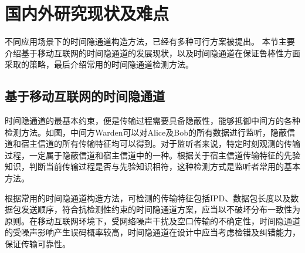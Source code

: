 \section{国内外研究现状及难点}
\label{sec:intro:background}

不同应用场景下的时间隐通道构造方法，已经有多种可行方案被提出。
本节主要介绍基于移动互联网的时间隐通道的发展现状，以及时间隐通道在保证鲁棒性方面采取的策略，最后介绍常用的时间隐通道检测方法。

\subsection{基于移动互联网的时间隐通道}
\label{sec:intro:background:ctc}

时间隐通道的最基本约束，便是传输过程需要具备隐蔽性，能够抵御中间方的各种检测方法。如图，中间方Warden可以对Alice及Bob的所有数据进行监听，隐蔽信道和宿主信道的所有传输特征均可以得到。对于监听者来说，特定时刻观测的传输过程，一定属于隐蔽信道和宿主信道中的一种。根据关于宿主信道传输特征的先验知识，判断当前传输过程是否与先验知识相符，这种检测方式是监听者常用的基本方法。

根据常用的时间隐通道构造方法，可检测的传输特征包括IPD、数据包长度以及数据包发送顺序，符合抗检测性约束的时间隐通道方案，应当以不破坏分布一致性为原则。在移动互联网环境下，受网络噪声干扰及空口传输的不确定性，时间隐通道的受噪声影响产生误码概率较高，时间隐通道在设计中应当考虑检错及纠错能力，保证传输可靠性。


